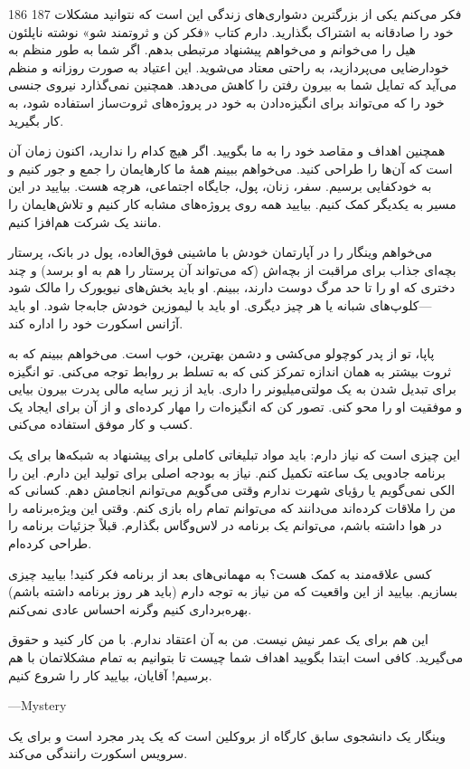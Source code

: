 186 187  
فکر می‌کنم یکی از بزرگترین دشواری‌های زندگی این است که نتوانید مشکلات خود را صادقانه به اشتراک بگذارید. دارم کتاب «فکر کن و ثروتمند شو» نوشته ناپلئون هیل را می‌خوانم و می‌خواهم پیشنهاد مرتبطی بدهم. اگر شما به طور منظم به خودارضایی می‌پردازید، به راحتی معتاد می‌شوید. این اعتیاد به صورت روزانه و منظم می‌آید که تمایل شما به بیرون رفتن را کاهش می‌دهد. همچنین نمی‌گذارد نیروی جنسی خود را که می‌تواند برای انگیزه‌دادن به خود در پروژه‌های ثروت‌ساز استفاده شود، به کار بگیرید.

همچنین اهداف و مقاصد خود را به ما بگویید. اگر هیچ کدام را ندارید، اکنون زمان آن است که آن‌ها را طراحی کنید. می‌خواهم ببینم همهٔ ما کارهایمان را جمع و جور کنیم و به خودکفایی برسیم. سفر، زنان، پول، جایگاه اجتماعی، هرچه هست. بیایید در این مسیر به یکدیگر کمک کنیم. بیایید همه روی پروژه‌های مشابه کار کنیم و تلاش‌هایمان را مانند یک شرکت هم‌افزا کنیم.

می‌خواهم وینگار را در آپارتمان خودش با ماشینی فوق‌العاده، پول در بانک، پرستار بچه‌ای جذاب برای مراقبت از بچه‌اش (که می‌تواند آن پرستار را هم به او برسد) و چند دختری که او را تا حد مرگ دوست دارند، ببینم. او باید بخش‌های نیویورک را مالک شود—کلوپ‌های شبانه یا هر چیز دیگری. او باید با لیموزین خودش جابه‌جا شود. او باید آژانس اسکورت خود را اداره کند.

پاپا، تو از پدر کوچولو می‌کشی و دشمن بهترین، خوب است. می‌خواهم ببینم که به ثروت بیشتر به همان اندازه تمرکز کنی که به تسلط بر روابط توجه می‌کنی. تو انگیزه برای تبدیل شدن به یک مولتی‌میلیونر را داری. باید از زیر سایه مالی پدرت بیرون بیایی و موفقیت او را محو کنی. تصور کن که انگیزه‌ات را مهار کرده‌ای و از آن برای ایجاد یک کسب و کار موفق استفاده می‌کنی.

این چیزی است که نیاز دارم: باید مواد تبلیغاتی کاملی برای پیشنهاد به شبکه‌ها برای یک برنامه جادویی یک ساعته تکمیل کنم. نیاز به بودجه اصلی برای تولید این دارم. این را الکی نمی‌گویم یا رؤیای شهرت ندارم وقتی می‌گویم می‌توانم انجامش دهم. کسانی که من را ملاقات کرده‌اند می‌دانند که می‌توانم تمام راه بازی کنم. وقتی این ویژه‌برنامه را در هوا داشته باشم، می‌توانم یک برنامه در لاس‌وگاس بگذارم. قبلاً جزئیات برنامه را طراحی کرده‌ام.

کسی علاقه‌مند به کمک هست؟ به مهمانی‌های بعد از برنامه فکر کنید! بیایید چیزی بسازیم. بیایید از این واقعیت که من نیاز به توجه دارم (باید هر روز برنامه داشته باشم) بهره‌برداری کنیم وگرنه احساس عادی نمی‌کنم.

این هم برای یک عمر نیش نیست. من به آن اعتقاد ندارم. با من کار کنید و حقوق می‌گیرید. کافی است ابتدا بگویید اهداف شما چیست تا بتوانیم به تمام مشکلاتمان با هم برسیم! آقایان، بیایید کار را شروع کنیم.

—Mystery

وینگار یک دانشجوی سابق کارگاه از بروکلین است که یک پدر مجرد است و برای یک سرویس اسکورت رانندگی می‌کند.